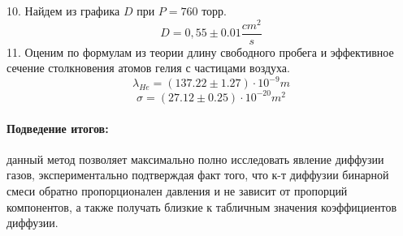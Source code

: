 \documentclass[a4paper]{article}
\begin{document}
	 10. Найдем из графика $D$ при $P = 760$ торр.
	 \begin{equation}
	 D=0,55 \pm 0.01 \frac{cm^2}{s}
	 \end{equation}
	 11. Оценим по формулам из теории длину свободного пробега и эффективное сечение столкновения атомов гелия с частицами воздуха.
	 \begin{equation}
	 \lambda_{He} = (137.22 \pm 1.27)\cdot 10^{-9} m
	 \end{equation}
	 \begin{equation}
	 \sigma = (27.12\pm0.25)\cdot 10^{-20} m^2
	 \end{equation}
	 \paragraph{Подведение итогов:}
	 данный метод позволяет максимально полно исследовать явление диффузии газов, экспериментально подтверждая факт того, что к-т диффузии бинарной смеси обратно пропорционален давления и не зависит от пропорций компонентов, а также получать близкие к табличным значения коэффициентов диффузии. 
\end{document}
